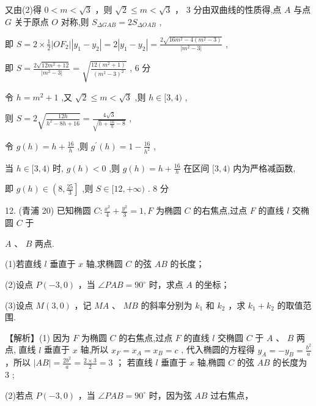 \documentclass[10pt]{article}
\begin{document}
又由(2)得 \(0 < m < \sqrt{3}\) ，则 \(\sqrt{2} \leq  m < \sqrt{3}\) ， 3 分由双曲线的性质得,点 \(A\) 与点 \(G\) 关于原点 \(O\) 对称,则 \({S}_{\Delta GAB} = 2{S}_{\Delta OAB}\) ,

即 \(S = 2 \times  \frac{1}{2}\left| {O{F}_{2}}\right| \left| {{y}_{1} - {y}_{2}}\right|  = 2\left| {{y}_{1} - {y}_{2}}\right|  = \frac{2\sqrt{{16}{m}^{2} - 4\left( {{m}^{2} - 3}\right) }}{\left| {m}^{2} - 3\right| }\) ,

即 \(S = \frac{2\sqrt{{12}{m}^{2} + {12}}}{\left| {m}^{2} - 3\right| } = \sqrt{\frac{{12}\left( {{m}^{2} + 1}\right) }{{\left( {m}^{2} - 3\right) }^{2}}}\) , 6 分

令 \(h = {m}^{2} + 1\) ,又 \(\sqrt{2} \leq  m < \sqrt{3}\) ,则 \(h \in  \lbrack 3,4)\) ,

则 \(S = 2\sqrt{\frac{12h}{{h}^{2} - {8h} + {16}}} = \frac{4\sqrt{3}}{\sqrt{h + \frac{16}{h} - 8}}\) ,

令 \(g\left( h\right)  = h + \frac{16}{h}\) ,则 \({g}^{\prime }\left( h\right)  = 1 - \frac{16}{{h}^{2}}\) ,

当 \(h \in  \lbrack 3,4)\) 时, \(g\left( h\right)  < 0\) ,则 \(g\left( h\right)  = h + \frac{16}{h}\) 在区间 \(\lbrack 3,4)\) 内为严格减函数,

即 \(g\left( h\right)  \in  \left( {8,\frac{25}{3}}\right\rbrack\) ,则 \(S \in  \lbrack {12}, + \infty )\) . 8 分

12. (青浦 20) 已知椭圆 \(C : \frac{{x}^{2}}{4} + \frac{{y}^{2}}{3} = 1,F\) 为椭圆 \(C\) 的右焦点,过点 \(F\) 的直线 \(l\) 交椭圆 \(C\) 于

\(A\text{ 、 }B\) 两点.

(1)若直线 \(l\) 垂直于 \(x\) 轴,求椭圆 \(C\) 的弦 \({AB}\) 的长度；

(2)设点 \(P\left( {-3,0}\right)\) ，当 \(\angle {PAB} = {90}^{ \circ  }\) 时，求点 \(A\) 的坐标；

(3)设点 \(M\left( {3,0}\right)\) ，记 \({MA}\) 、 \({MB}\) 的斜率分别为 \({k}_{1}\) 和 \({k}_{2}\) ，求 \({k}_{1} + {k}_{2}\) 的取值范围.

【解析】(1) 因为 \(F\) 为椭圆 \(C\) 的右焦点,过点 \(F\) 的直线 \(l\) 交椭圆 \(C\) 于 \(A\text{ 、 }B\) 两点, 直线 \(l\) 垂直于 \(x\) 轴,所以 \({x}_{F} = {x}_{A} = {x}_{B} = c\) , 代入椭圆的方程得 \({y}_{A} =  - {y}_{B} = \frac{{b}^{2}}{a}\) ，所以 \(\left| {AB}\right|  = \frac{2{b}^{2}}{a} = \frac{2 \times  3}{2} = 3\) ； 若直线 \(l\) 垂直于 \(x\) 轴,椭圆 \(C\) 的弦 \({AB}\) 的长度为 3 ;

(2)若点 \(P\left( {-3,0}\right)\) ，当 \(\angle {PAB} = {90}^{ \circ  }\) 时，因为弦 \({AB}\) 过右焦点，
\end{document}
